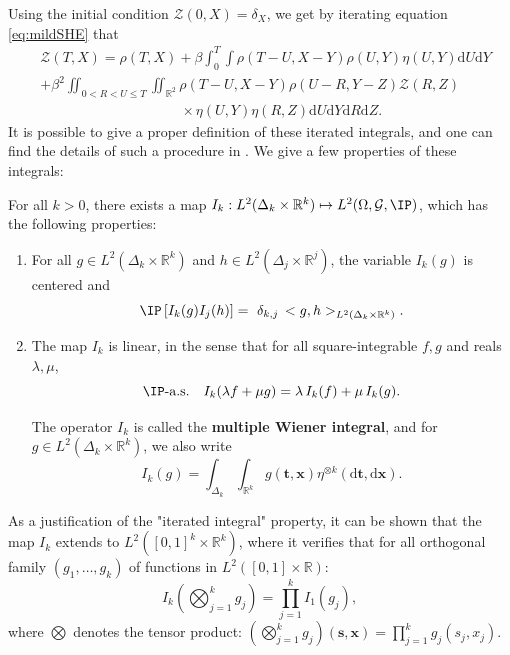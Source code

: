 Using the initial condition $\mathcal{Z}(0,X) = \delta_X$, we get by iterating equation \eqref{eq:mildSHE} that
\begin{align*}
&\mathcal{Z}(T,X) = \rho(T,X) + \beta \int_0^T \int \rho(T-U,X-Y) \rho(U,Y) \eta(U,Y) \mathrm{d}U \mathrm{d}Y \\
&+ \beta^2 \iint_{0<R<U\leq T} \iint_{\mathbb{R}^2} \rho(T-U,X-Y) \rho(U-R,Y-Z) \mathcal{Z}(R,Z) \\
& \qquad \qquad \qquad \qquad \qquad \times \eta(U,Y) \eta(R,Z) \mathrm{d}U \mathrm{d}Y  \mathrm{d}R \mathrm{d}Z.
\end{align*}
It is possible to give a proper definition of these iterated integrals, and one can find the details of such a procedure in \cite[Chapter 7]{janson_1997}. We give a few properties of these integrals:
\begin{property}  For all $k>0$, there exists a map $I_k:L^2(\Delta_k \times \mathbb{R}^k)\mapsto L^2(\Omega,\mathcal{G},\IP)$, which has the following properties:
\begin{enumerate}[label = (\roman*)]
\item For all $g\in L^2(\Delta_k \times \mathbb{R}^k)$ and $h\in L^2(\Delta_j \times \mathbb{R}^j)$, the variable $I_k(g)$ is centered and
\begin{equation} \label{eq:Wiener_cov_struct}
\IP \left[{I}_k(g) {I}_j(h)\right] =\ \delta_{k,j} \, <g,h>_{L^2(\Delta_k \times \mathbb{R}^k)}.
\end{equation}
\item The map $I_k$ is linear, in the sense that for all square-integrable $f,g$ and reals $\lambda,\mu$,
\begin{equation*}
\IP \text{-a.s.} \quad I_k(\lambda f + \mu g) = \lambda \, I_k(f) + \mu \,I_k(g).
\end{equation*}

The operator $I_k$ is called the \textbf{multiple Wiener integral}, and for $g\in L^2(\Delta_k \times \mathbb{R}^k)$, we also write
\[I_k(g) = \int_{\Delta_k} \int_{\mathbb{R}^k} g(\mathbf{t},\mathbf{x}) \eta^{\otimes k}(\mathrm{d}\mathbf{t},\mathrm{d}\mathbf{x}).\]
\end{enumerate}
\end{property}
\begin{remark} As a justification of the "iterated integral" property, it can be shown that the map $I_k$ extends to $L^2([0,1]^k\times \mathbb{R}^k)$, where it verifies that for all orthogonal family $(g_1,\dots,g_k)$ of functions in $L^2([0,1] \times \mathbb{R})$:
\begin{equation} \label{eq:IkOrthog} {I}_k\left(\bigotimes_{j=1}^k g_j \right) =  \prod_{j=1}^k I_1(g_j),
\end{equation}
where $\bigotimes$ denotes the tensor product: $(\bigotimes_{j=1}^k g_j)(\mathbf{s},\mathbf{x}) = \prod_{j=1}^k g_j(s_j,x_j)$.
\end{remark}

